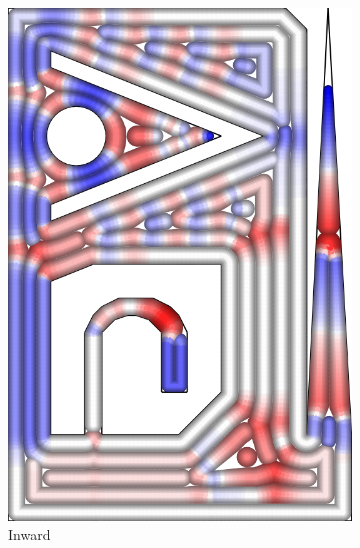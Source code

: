 \begin{figure}
\begin{subfigure}{\figwidth}
\includegraphics[height=\figheight]{sources-validation-gMAT-example-TEST-InwardDistributed-widths.png}
\caption{Inward }\label{TEST_InwardDistributed_accuracy}
\end{subfigure}
\begin{subfigure}{.04\columnwidth}\centering
\vspace{4.7cm}

\end{subfigure}
\end{figure}
